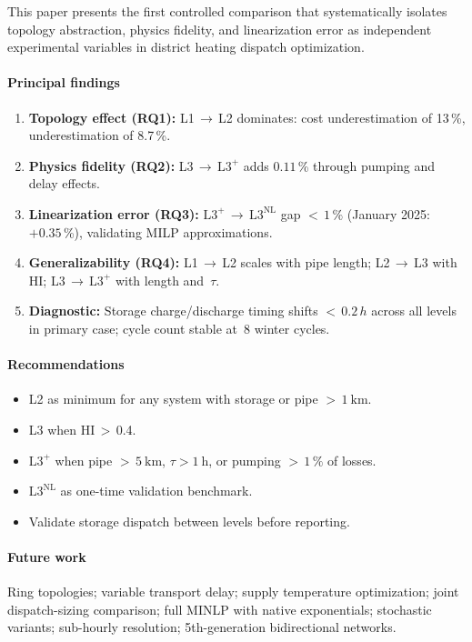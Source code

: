\documentclass[review,3p]{elsarticle}
\newcommand{\Lplus}{\mathrm{L3}^{+}}
\newcommand{\Lnl}{\mathrm{L3}^{\mathrm{NL}}}
\begin{document}
This paper presents the first controlled comparison that
systematically isolates topology abstraction, physics fidelity, and
linearization error as independent experimental variables in district
heating dispatch optimization.

\paragraph{Principal findings}
\begin{enumerate}[nosep]
  \item \textbf{Topology effect (RQ1):} L1\,$\to$\,L2 dominates:
        cost underestimation of 13\,\%, 
        underestimation of 8.7\,\%.
  \item \textbf{Physics fidelity (RQ2):} L3\,$\to$\,$\Lplus$ adds
        $0.11$\,\% through pumping and delay effects.
  \item \textbf{Linearization error (RQ3):}
        $\Lplus$\,$\to$\,$\Lnl$ gap
        ${<}\,1\,\%$ (January 2025: $+0.35$\,\%), validating MILP approximations.
  \item \textbf{Generalizability (RQ4):} L1\,$\to$\,L2 scales with
        pipe length; L2\,$\to$\,L3 with HI; L3\,$\to$\,$\Lplus$ with
        length and~$\tau$.
  \item \textbf{Diagnostic:} Storage charge/discharge timing shifts
        ${<}\,0.2\,h$ across all levels in primary case; cycle count
        stable at~8 winter cycles.
\end{enumerate}

\paragraph{Recommendations}
\begin{itemize}[nosep]
  \item L2 as minimum for any system with storage or pipe
        ${>}\,\SI{1}{\kilo\metre}$.
  \item L3 when HI\,$>$\,0.4.
  \item $\Lplus$ when pipe ${>}\,\SI{5}{\kilo\metre}$,
        $\tau > \SI{1}{\hour}$, or pumping
        ${>}\,1\,\%$ of losses.
  \item $\Lnl$ as one-time validation benchmark.
  \item Validate storage dispatch between levels before reporting.
\end{itemize}

\paragraph{Future work}
Ring topologies; variable transport delay; supply temperature
optimization; joint dispatch-sizing comparison; full MINLP with
native exponentials; stochastic variants; sub-hourly resolution;
5th-generation bidirectional networks.
\end{document}
